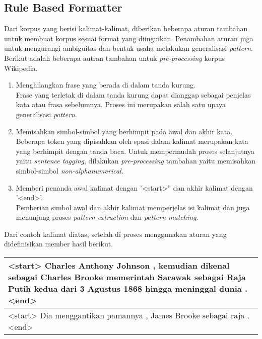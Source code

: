 \subsection{Rule Based Formatter}
Dari korpus yang berisi kalimat-kalimat, diberikan beberapa aturan tambahan untuk membuat korpus sesuai format yang diinginkan. Penambahan aturan juga untuk mengurangi ambiguitas dan bentuk usaha melakukan generalisasi \textit{pattern}. Berikut adalah beberapa autran tambahan untuk \textit{pre-processing} korpus Wikipedia.
\begin{enumerate}
  \item Menghilangkan frase yang berada di dalam tanda kurung. \\
  Frase yang terletak di dalam tanda kurung dapat dianggap sebagai penjelas kata atau frasa sebelumnya. Proses ini merupakan salah satu upaya generalisasi \textit{pattern}.
  \item Memisahkan simbol-simbol yang berhimpit pada awal dan akhir kata. \\
  Beberapa token yang dipisahkan oleh spasi dalam kalimat merupakan kata yang berhimpit dengan tanda baca. Untuk mempermudah proses selanjutnya yaitu \textit{sentence tagging}, dilakukan \textit{pre-processing} tambahan yaitu memisahkan simbol-simbol \textit{non-alphanumerical}.
  \item Memberi penanda awal kalimat dengan '<start>'' dan akhir kalimat dengan '<end>'. \\
  Pemberian simbol awal dan akhir kalimat memperjelas isi kalimat dan juga menunjang proses \textit{pattern extraction} dan \textit{pattern matching}.
\end{enumerate}

Dari contoh kalimat diatas, setelah di proses menggunakan aturan yang didefinisikan member hasil berikut.
\begin{center}
\begin{tabular}{ | m{32em} | } 
\hline
<start> Charles Anthony Johnson , kemudian dikenal sebagai Charles Brooke memerintah Sarawak sebagai Raja Putih kedua dari 3 Agustus 1868 hingga meninggal dunia . <end> \\
\hline 
<start> Dia menggantikan pamannya , James Brooke sebagai raja . <end> \\
\hline
\end{tabular}
\end{center}


